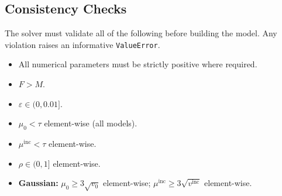 \documentclass[11pt,a4paper]{article}
\begin{document}
\subsection{Consistency Checks}

The solver must validate all of the following before building the model.
Any violation raises an informative \texttt{ValueError}.

\begin{itemize}[leftmargin=1.5em]
  \item All numerical parameters must be strictly positive where required.
  \item $F > M$.
  \item $\varepsilon \in (0, 0.01]$.
  \item $\mu_0 < \tau$ element-wise (all models).
  \item $\mu^{\mathrm{inc}} < \tau$ element-wise.
  \item $\rho \in (0, 1]$ element-wise.
  \item \textbf{Gaussian:} $\mu_0 \geq 3\sqrt{v_0}$ element-wise;
        $\mu^{\mathrm{inc}} \geq 3\sqrt{v^{\mathrm{inc}}}$ element-wise.


\end{itemize}
\end{document}
